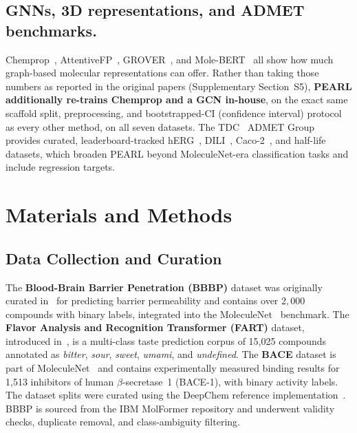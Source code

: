 \documentclass[final,1p,times]{elsarticle}
\begin{document}
\subsection{GNNs, 3D representations, and ADMET benchmarks.} \label{Graph}
Chemprop~\cite{yang2019chemprop}, AttentiveFP~\cite{xiong2020attentivefp}, GROVER~\cite{rong2020grover}, and Mole-BERT~\cite{xia2023molecbert} all show how much graph-based molecular representations can offer. Rather than taking those numbers as reported in the original papers (Supplementary Section~S5), \textbf{PEARL additionally re-trains Chemprop and a GCN in-house}, on the exact same scaffold split, preprocessing, and bootstrapped-CI (confidence interval) protocol as every other method, on all seven datasets. The TDC~\cite{huang2021tdc} ADMET Group provides curated, leaderboard-tracked hERG~\cite{wang2016herg}, DILI~\cite{xu2019dili}, Caco-2~\cite{wang2016caco2}, and half-life~\cite{obach2008half} datasets, which broaden PEARL beyond MoleculeNet-era classification tasks and include regression targets.


\section{Materials and Methods} \label{Materials_Methods}
\subsection{Data Collection and Curation} \label{data_collection}
The \textbf{Blood-Brain Barrier Penetration (BBBP)} dataset was originally curated in~\cite{martins2012bayesian} for predicting barrier permeability and contains over $2,000$ compounds with binary labels, integrated into the MoleculeNet~\cite{wu2018moleculenet} benchmark.
The \textbf{Flavor Analysis and Recognition Transformer (FART)} dataset, introduced in~\cite{zimmermann2024fart}, is a multi-class taste prediction corpus of 15,025 compounds annotated as \textit{bitter}, \textit{sour}, \textit{sweet}, \textit{umami}, and \textit{undefined}. 
The \textbf{BACE} dataset is part of MoleculeNet~\cite{wu2018moleculenet} and contains experimentally measured binding results for 1,513 inhibitors of human $\beta$-secretase~1 (BACE-1), with binary activity labels. 
The dataset splits were curated using the DeepChem reference implementation~\cite{ramsundar2019deep}. BBBP is sourced from the IBM MolFormer repository and underwent validity checks, duplicate removal, and class-ambiguity filtering.
\end{document}
